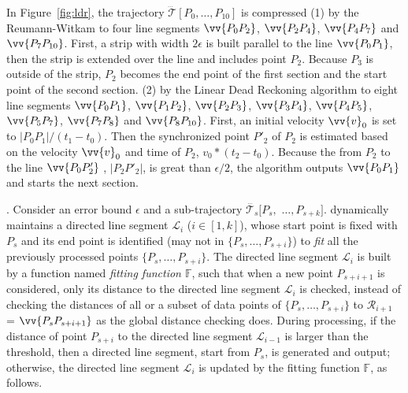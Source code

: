 {\begin{example}
\label{exm-alg-strip}
In Figure~\ref{fig:ldr}, the trajectory $\dddot{\mathcal{T}}[P_0, \ldots, P_{10}]$ is compressed
%
(1) by the Reumann-Witkam to four line segments $\vv{P_0P_2}$, $\vv{P_2P_4}$, $\vv{P_4P_7}$ and $\vv{P_7P_{10}}$. First, a strip with width $2\epsilon$ is built parallel to the line $\vv{P_0P_1}$, then the strip is extended over the line and includes point $P_2$. Because $P_3$ is outside of the strip, $P_2$ becomes the end point of the first section and the start point of the second section.
%
(2) by the Linear Dead Reckoning algorithm to eight line segments $\vv{P_0P_1}$, $\vv{P_1P_2}$, $\vv{P_2P_3}$, $\vv{P_3P_4}$, $\vv{P_4P_5}$, $\vv{P_5P_7}$, $\vv{P_7P_8}$ and $\vv{P_8P_{10}}$. First, an initial velocity ${\vv{v}_0}$ is set to $|P_0P_1|/(t_1-t_0)$. Then the synchronized point $P'_2$ of $P_2$ is estimated based on the velocity ${\vv{v}_0}$ and time of $P_2$, \ie ${v}_0 * (t_2-t_0)$. Because the \sed from $P_2$ to the line $\vv{P_0P'_2}$ , \ie $|P_2P'_2|$, is great than $\epsilon/2$, the algorithm outputs $\vv{P_0P_1}$ and starts the next section.
\end{example}

}%


.
%
Consider an error bound $\epsilon$ and a sub-trajectory $\dddot{\mathcal{T}_s}[P_s,$ $\ldots, P_{s+k}]$.
\operb dynamically maintains a directed line segment $\mathcal{L}_i$ ($i\in[1,k]$), whose start point is fixed with $P_s$ and its end point is identified (may not in $\{P_s, \ldots, P_{s+i}\}$) to {\em fit} all the previously processed points $\{P_s, \ldots, P_{s+i}\}$.
The directed line segment $\mathcal{L}_i$ is built by a function named \emph{fitting function $\mathbb{F}$}, such that when a new point $P_{s+i+1}$ is considered, only its distance to the directed line segment $\mathcal{L}_i$ is checked, instead of checking the distances of all or a subset of data points of $\{P_{s}, \ldots, P_{s+i}\}$ to $\mathcal{R}_{i+1}$ = $\vv{P_sP_{s+i+1}}$ as the global distance checking does.
During processing, if the distance of point $P_{s+i}$ to the directed line segment $\mathcal{L}_{i-1}$ is larger than the threshold, then a directed line segment, start from $P_s$, is generated and output;
otherwise, the directed line segment $\mathcal{L}_i$ is updated by the fitting function $\mathbb{F}$, as follows.

